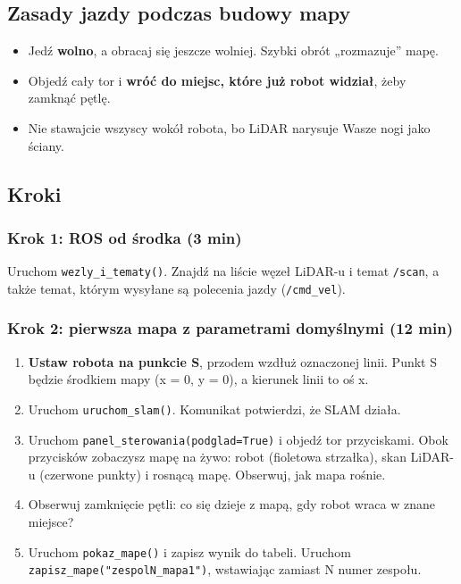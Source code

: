 \subsection{Zasady jazdy podczas budowy mapy}\label{zasady-jazdy-podczas-budowy-mapy}

\begin{itemize}
\tightlist
\item
  Jedź \textbf{wolno}, a obracaj się jeszcze wolniej. Szybki obrót „rozmazuje'' mapę.
\item
  Objedź cały tor i \textbf{wróć do miejsc, które już robot widział}, żeby zamknąć pętlę.
\item
  Nie stawajcie wszyscy wokół robota, bo LiDAR narysuje Wasze nogi jako ściany.
\end{itemize}

\subsection{Kroki}\label{kroki}

\subsubsection{Krok 1: ROS od środka (3 min)}\label{krok-1-ros-od-ux15brodka-3-min}

Uruchom \texttt{wezly\_i\_tematy()}. Znajdź na liście węzeł LiDAR-u i temat \texttt{/scan}, a także temat, którym wysyłane są polecenia jazdy (\texttt{/cmd\_vel}).

\subsubsection{Krok 2: pierwsza mapa z parametrami domyślnymi (12 min)}\label{krok-2-pierwsza-mapa-z-parametrami-domyux15blnymi-12-min}

\begin{enumerate}
\def\labelenumi{\arabic{enumi}.}
\tightlist
\item
  \textbf{Ustaw robota na punkcie S}, przodem wzdłuż oznaczonej linii. Punkt S będzie środkiem mapy (x = 0, y = 0), a kierunek linii to oś x.
\item
  Uruchom \texttt{uruchom\_slam()}. Komunikat potwierdzi, że SLAM działa.
\item
  Uruchom \texttt{panel\_sterowania(podglad=True)} i objedź tor przyciskami. Obok przycisków zobaczysz mapę na żywo: robot (fioletowa strzałka), skan LiDAR-u (czerwone punkty) i rosnącą mapę. Obserwuj, jak mapa rośnie.
\item
  Obserwuj zamknięcie pętli: co się dzieje z mapą, gdy robot wraca w znane miejsce?
\item
  Uruchom \texttt{pokaz\_mape()} i zapisz wynik do tabeli. Uruchom \texttt{zapisz\_mape("zespolN\_mapa1")}, wstawiając zamiast N numer zespołu.
\end{enumerate}

